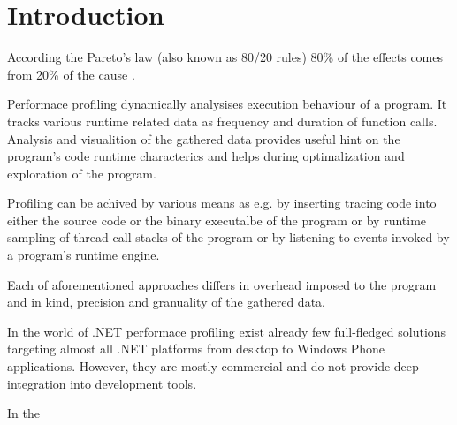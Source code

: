 \chapter{Introduction}

According the Pareto's law (also known as 80/20 rules) 80\% of the effects comes from 20\% of the cause \cite{RicKoch1999}.

Performace profiling dynamically analysises execution behaviour of a program. It tracks various runtime related data as frequency and duration of function calls. Analysis and visualition of the gathered data provides useful hint on the program's code runtime characterics and helps during optimalization and exploration of the program.
	
Profiling can be achived by various means as e.g. by inserting tracing code into either the source code or the binary executalbe of the program or by runtime sampling of thread call stacks of the program or by listening to events invoked by a program's runtime engine.

Each of aforementioned approaches differs in overhead imposed to the program and in kind, precision and granuality of the gathered data.

In the world of .NET performace profiling exist already few full-fledged solutions targeting almost all .NET platforms from desktop to Windows Phone applications. However, they are mostly commercial and do not provide deep integration into development tools.  

In the 